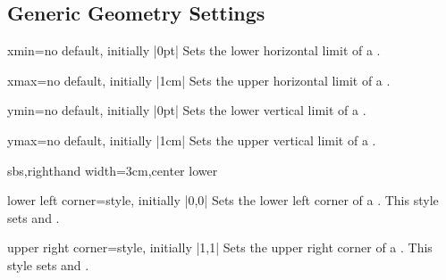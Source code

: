 % 


\subsection{Generic Geometry Settings}\label{subsec:vignettegeometry}


\begin{vigTcbKey}[][doc new=2016-04-22]{xmin}{=}{no default, initially |0pt|}
  Sets the lower horizontal limit of a .
\end{vigTcbKey}

\begin{vigTcbKey}[][doc new=2016-04-22]{xmax}{=}{no default, initially |1cm|}
  Sets the upper horizontal limit of a .
\end{vigTcbKey}

\begin{vigTcbKey}[][doc new=2016-04-22]{ymin}{=}{no default, initially |0pt|}
  Sets the lower vertical limit of a .
\end{vigTcbKey}

\begin{vigTcbKey}[][doc new=2016-04-22]{ymax}{=}{no default, initially |1cm|}
  Sets the upper vertical limit of a .
\end{vigTcbKey}


\begin{dispExample*}{sbs,righthand width=3cm,center lower}
\end{dispExample*}


\begin{vigTcbKey}[][doc new=2016-04-22]{lower left corner}{=}{style, initially |0,0|}
  Sets the lower left corner of a .
  This style sets  and .
\end{vigTcbKey}

\begin{vigTcbKey}[][doc new=2016-04-22]{upper right corner}{=}{style, initially |1,1|}
  Sets the upper right corner of a .
  This style sets  and .
\end{vigTcbKey}



